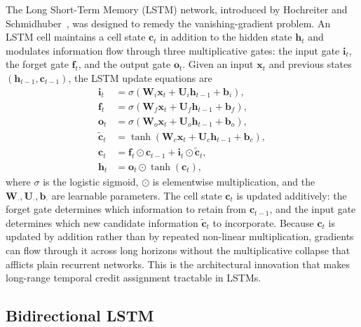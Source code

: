 \documentclass[%
    BCOR=10mm,
    DIV=13,
    toc=bibliography,
    toc=listof,
    oneside,
    12pt,
]{scrbook}
\begin{document}
The Long Short-Term Memory (LSTM) network, introduced by Hochreiter and
Schmidhuber~\cite{hochreiter1997}, was designed to remedy the
vanishing-gradient problem. An LSTM cell maintains a cell state $\mathbf{c}_t$
in addition to the hidden state $\mathbf{h}_t$ and modulates information flow
through three multiplicative gates: the input gate $\mathbf{i}_t$, the forget
gate $\mathbf{f}_t$, and the output gate $\mathbf{o}_t$. Given an input
$\mathbf{x}_t$ and previous states $(\mathbf{h}_{t-1}, \mathbf{c}_{t-1})$, the
LSTM update equations are
\begin{subequations}
\begin{align}
  \mathbf{i}_t &= \sigma\!\left( \mathbf{W}_i \mathbf{x}_t + \mathbf{U}_i \mathbf{h}_{t-1} + \mathbf{b}_i \right), \label{eq:lstm_i}\\
  \mathbf{f}_t &= \sigma\!\left( \mathbf{W}_f \mathbf{x}_t + \mathbf{U}_f \mathbf{h}_{t-1} + \mathbf{b}_f \right), \label{eq:lstm_f}\\
  \mathbf{o}_t &= \sigma\!\left( \mathbf{W}_o \mathbf{x}_t + \mathbf{U}_o \mathbf{h}_{t-1} + \mathbf{b}_o \right), \label{eq:lstm_o}\\
  \tilde{\mathbf{c}}_t &= \tanh\!\left( \mathbf{W}_c \mathbf{x}_t + \mathbf{U}_c \mathbf{h}_{t-1} + \mathbf{b}_c \right), \label{eq:lstm_ctilde}\\
  \mathbf{c}_t &= \mathbf{f}_t \odot \mathbf{c}_{t-1} + \mathbf{i}_t \odot \tilde{\mathbf{c}}_t, \label{eq:lstm_c}\\
  \mathbf{h}_t &= \mathbf{o}_t \odot \tanh(\mathbf{c}_t), \label{eq:lstm_h}
\end{align}
\end{subequations}
where $\sigma$ is the logistic sigmoid, $\odot$ is elementwise
multiplication, and the $\mathbf{W}_\cdot, \mathbf{U}_\cdot, \mathbf{b}_\cdot$
are learnable parameters. The cell state $\mathbf{c}_t$ is updated additively:
the forget gate determines which information to retain from $\mathbf{c}_{t-1}$,
and the input gate determines which new candidate information
$\tilde{\mathbf{c}}_t$ to incorporate. Because $\mathbf{c}_t$ is updated by
addition rather than by repeated non-linear multiplication, gradients can
flow through it across long horizons without the multiplicative collapse that
afflicts plain recurrent networks. This is the architectural innovation that
makes long-range temporal credit assignment tractable in LSTMs.

\subsection{Bidirectional LSTM}
\label{subsec:bilstm}
\end{document}
